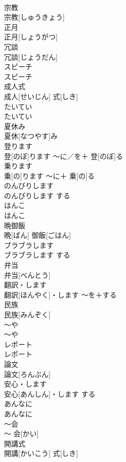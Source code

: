 \documentclass[8pt]{extreport}
\begin{document}
\begin{CJK}{UTF8}{min}
\\	宗教	
\\	宗教[しゅうきょう]		
\\	正月	
\\	正月[しょうがつ]		
\\	冗談	
\\	冗談[じょうだん]		
\\	スピーチ	
\\	スピーチ		
\\	成人式	
\\	成人[せいじん] 式[しき]		
\\	たいてい	
\\	たいてい		
\\	夏休み	
\\	夏休[なつやす]み		
\\	登ります	
\\	登[のぼ]ります	〜に／を＋ 登[のぼ]る	
\\	乗ります	
\\	乗[の]ります	〜に＋ 乗[の]る	
\\	のんびりします	
\\	のんびりします	する	
\\	はんこ	
\\	はんこ		
\\	晩御飯	
\\	晩[ばん] 御飯[ごはん]		
\\	ブラブラします	
\\	ブラブラします	する	
\\	弁当	
\\	弁当[べんとう]		
\\	翻訳・します	
\\	翻訳[ほんやく]・します	〜を＋する	
\\	民族	
\\	民族[みんぞく]		
\\	〜や	
\\	〜や		
\\	レポート	
\\	レポート		
\\	論文	
\\	論文[ろんぶん]		
\\	安心・します	
\\	安心[あんしん]・します	する	
\\	あんなに	
\\	あんなに		
\\	〜会	
\\	〜 会[かい]		
\\	開講式	
\\	開講[かいこう] 式[しき]		

\end{CJK}
\end{document}
